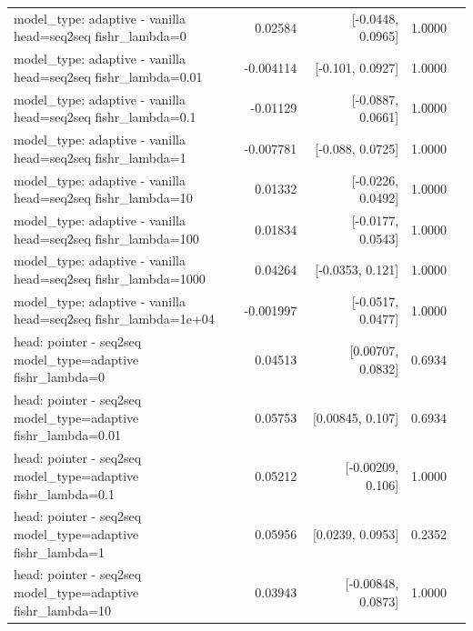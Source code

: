 \documentclass[10pt]{article}
\makeatletter
\newcommand{\stackcell}[1]{\begin{tabular}[t]{@{}l@{}}#1\end{tabular}}
\makeatother
\begin{document}
{\begin{longtable}{lrrrl}
\stackcell{model\_type: adaptive - vanilla\\\footnotesize head=seq2seq fishr\_lambda=0 } & 0.02584 & [-0.0448, 0.0965] & 1.0000 & \\
\stackcell{model\_type: adaptive - vanilla\\\footnotesize head=seq2seq fishr\_lambda=0.01 } & -0.004114 & [-0.101, 0.0927] & 1.0000 & \\
\stackcell{model\_type: adaptive - vanilla\\\footnotesize head=seq2seq fishr\_lambda=0.1 } & -0.01129 & [-0.0887, 0.0661] & 1.0000 & \\
\stackcell{model\_type: adaptive - vanilla\\\footnotesize head=seq2seq fishr\_lambda=1 } & -0.007781 & [-0.088, 0.0725] & 1.0000 & \\
\stackcell{model\_type: adaptive - vanilla\\\footnotesize head=seq2seq fishr\_lambda=10 } & 0.01332 & [-0.0226, 0.0492] & 1.0000 & \\
\stackcell{model\_type: adaptive - vanilla\\\footnotesize head=seq2seq fishr\_lambda=100 } & 0.01834 & [-0.0177, 0.0543] & 1.0000 & \\
\stackcell{model\_type: adaptive - vanilla\\\footnotesize head=seq2seq fishr\_lambda=1000 } & 0.04264 & [-0.0353, 0.121] & 1.0000 & \\
\stackcell{model\_type: adaptive - vanilla\\\footnotesize head=seq2seq fishr\_lambda=1e+04 } & -0.001997 & [-0.0517, 0.0477] & 1.0000 & \\
\stackcell{head: pointer - seq2seq\\\footnotesize model\_type=adaptive fishr\_lambda=0 } & 0.04513 & [0.00707, 0.0832] & 0.6934 & \\
\stackcell{head: pointer - seq2seq\\\footnotesize model\_type=adaptive fishr\_lambda=0.01 } & 0.05753 & [0.00845, 0.107] & 0.6934 & \\
\stackcell{head: pointer - seq2seq\\\footnotesize model\_type=adaptive fishr\_lambda=0.1 } & 0.05212 & [-0.00209, 0.106] & 1.0000 & \\
\stackcell{head: pointer - seq2seq\\\footnotesize model\_type=adaptive fishr\_lambda=1 } & 0.05956 & [0.0239, 0.0953] & 0.2352 & \\
\stackcell{head: pointer - seq2seq\\\footnotesize model\_type=adaptive fishr\_lambda=10 } & 0.03943 & [-0.00848, 0.0873] & 1.0000 & \\

\end{longtable}}
\end{document}
